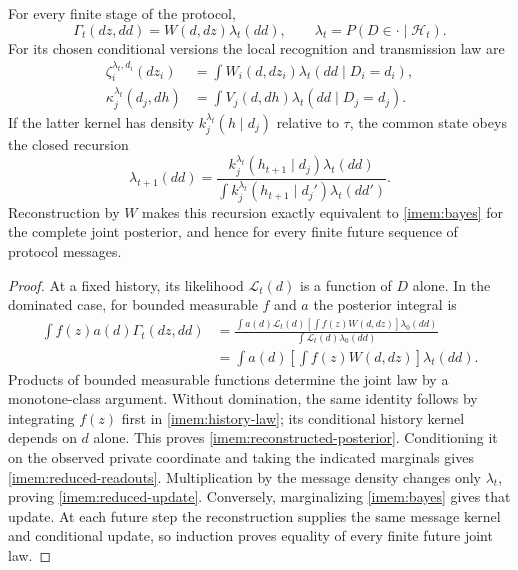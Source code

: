 For every finite stage of the protocol,
\begin{equation}
 \Gamma_t(dz,dd)=W(d,dz)\lambda_t(dd),\qquad
 \lambda_t=P(D\in\cdot\mid\mathcal H_t).
 \label{imem:reconstructed-posterior}
\end{equation}
For its chosen conditional versions the local recognition and transmission law are
\begin{equation}
 \begin{aligned}
 \zeta_i^{\lambda_t,d_i}(dz_i)
 &=\int W_i(d,dz_i)\lambda_t(dd\mid D_i=d_i),\\
 \kappa_j^{\lambda_t}(d_j,dh)
 &=\int V_j(d,dh)\lambda_t(dd\mid D_j=d_j).
 \end{aligned}
 \label{imem:reduced-readouts}
\end{equation}
If the latter kernel has density $k_j^{\lambda_t}(h\mid d_j)$ relative to $\tau$, the common state obeys the closed recursion
\begin{equation}
 \lambda_{t+1}(dd)=
 \frac{k_j^{\lambda_t}(h_{t+1}\mid d_j)\lambda_t(dd)}
 {\int k_j^{\lambda_t}(h_{t+1}\mid d_j')\lambda_t(dd')}.
 \label{imem:reduced-update}
\end{equation}
Reconstruction by $W$ makes this recursion exactly equivalent to \cref{imem:bayes} for the complete joint posterior, and hence for every finite future sequence of protocol messages.
\begin{proof}
At a fixed history, its likelihood $\mathcal L_t(d)$ is a function of $D$ alone. In the dominated case, for bounded measurable $f$ and $a$ the posterior integral is
\begin{equation}
 \begin{split}
 \int f(z)a(d)\Gamma_t(dz,dd)
 &=\frac{\int a(d)\mathcal L_t(d)
       [\int f(z)W(d,dz)]\lambda_0(dd)}
       {\int\mathcal L_t(d)\lambda_0(dd)}\\
 &=\int a(d)\left[\int f(z)W(d,dz)\right]\lambda_t(dd).
 \end{split}
 \label{imem:reconstruction-proof}
\end{equation}
Products of bounded measurable functions determine the joint law by a monotone-class argument. Without domination, the same identity follows by integrating $f(z)$ first in \cref{imem:history-law}; its conditional history kernel depends on $d$ alone. This proves \cref{imem:reconstructed-posterior}. Conditioning it on the observed private coordinate and taking the indicated marginals gives \cref{imem:reduced-readouts}. Multiplication by the message density changes only $\lambda_t$, proving \cref{imem:reduced-update}. Conversely, marginalizing \cref{imem:bayes} gives that update. At each future step the reconstruction supplies the same message kernel and conditional update, so induction proves equality of every finite future joint law.
\end{proof}

